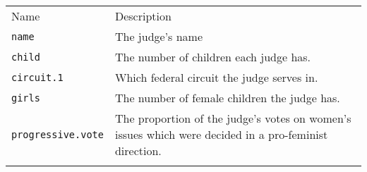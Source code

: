 \documentclass[]{article}
\begin{document}
\begin{longtable}[c]{@{}ll@{}}
\toprule\addlinespace
\begin{minipage}[b]{0.34\columnwidth}\raggedright
Name
\end{minipage} & \begin{minipage}[b]{0.59\columnwidth}\raggedright
Description
\end{minipage}
\\\addlinespace
\midrule\endhead
\begin{minipage}[t]{0.34\columnwidth}\raggedright
\texttt{name}
\end{minipage} & \begin{minipage}[t]{0.59\columnwidth}\raggedright
The judge's name
\end{minipage}
\\\addlinespace
\begin{minipage}[t]{0.34\columnwidth}\raggedright
\texttt{child}
\end{minipage} & \begin{minipage}[t]{0.59\columnwidth}\raggedright
The number of children each judge has.
\end{minipage}
\\\addlinespace
\begin{minipage}[t]{0.34\columnwidth}\raggedright
\texttt{circuit.1}
\end{minipage} & \begin{minipage}[t]{0.59\columnwidth}\raggedright
Which federal circuit the judge serves in.
\end{minipage}
\\\addlinespace
\begin{minipage}[t]{0.34\columnwidth}\raggedright
\texttt{girls}
\end{minipage} & \begin{minipage}[t]{0.59\columnwidth}\raggedright
The number of female children the judge has.
\end{minipage}
\\\addlinespace
\begin{minipage}[t]{0.34\columnwidth}\raggedright
\texttt{progressive.vote}
\end{minipage} & \begin{minipage}[t]{0.59\columnwidth}\raggedright
The proportion of the judge's votes on women's issues which were decided
in a pro-feminist direction.
\end{minipage}
\\\addlinespace
\begin{minipage}[t]{0.34\columnwidth}\raggedright

\end{minipage}
\end{longtable}
\end{document}
